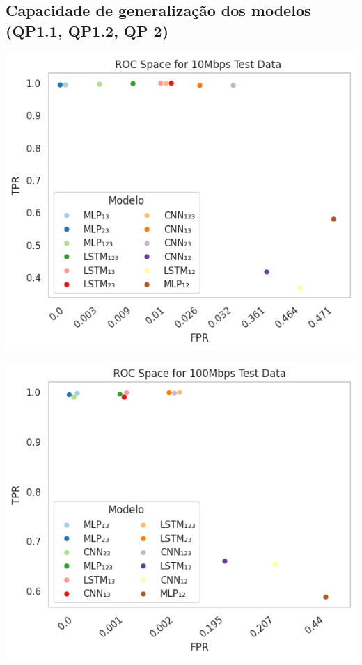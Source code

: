 \documentclass[a4paper,fleqn]{cas-sc}
\begin{document}
\subsection{Capacidade de generalização dos modelos (QP1.1, QP1.2, QP 2)}
\begingroup
\captionsetup[figure]{font=tiny}
\hfill
\begin{minipage}{0.1\textwidth}
	\centering
	\includegraphics[width=1.0\textwidth]{./figs/ROC-Space-Test-Data-10Mbps.png}
	\label{fig:ROCDesempenhoteste10Mbps}	
\end{minipage}
\begin{minipage}{0.1\textwidth}
	\centering
	\includegraphics[width=1.0\textwidth]{./figs/ROC-Space-Test-Data-100Mbps.png}
	\label{fig:ROCDesempenhoteste100Mbps}	
\end{minipage}
\end{document}
